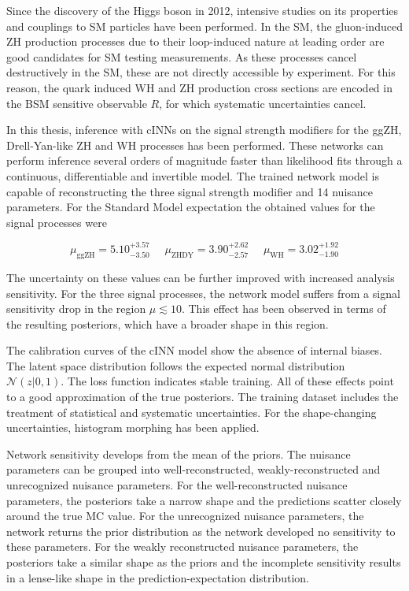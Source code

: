 \label{sec:conclusion}

Since the discovery of the Higgs boson in 2012, intensive studies on its properties and couplings to SM particles have been performed. In the SM, the gluon-induced ZH production processes due to their loop-induced nature at leading order are good candidates for SM testing measurements. As these processes cancel destructively in the SM, these are not directly accessible by experiment. For this reason, the quark induced WH and ZH production cross sections are encoded in the BSM sensitive observable $R$, for which systematic uncertainties cancel.

In this thesis, inference with cINNs on the signal strength modifiers for the ggZH, Drell-Yan-like ZH and WH processes has been performed. These networks can perform inference several orders of magnitude faster than likelihood fits through a continuous, differentiable and invertible model. The trained network model is capable of reconstructing the three signal strength modifier and 14 nuisance parameters.
For the Standard Model expectation the obtained values for the signal processes were

\begin{equation*}
		\mu_\text{ggZH} = 5.10^{+3.57}_{-3.50} \, \, \quad \mu_\text{ZHDY} = 3.90^{+2.62}_{-2.57} \, \, \quad \mu_\text{WH} = 3.02^{+1.92}_{-1.90}
\end{equation*}

The uncertainty on these values can be further improved with increased analysis sensitivity. For the three signal processes, the network model suffers from a signal sensitivity drop in the region $\mu\lesssim10$. This effect has been observed in terms of the resulting posteriors, which have a broader shape in this region.

The calibration curves of the cINN model show the absence of internal biases. The latent space distribution follows the expected normal distribution $\mathcal{N}(z | 0,1)$. The loss function indicates stable training. All of these effects point to a good approximation of the true posteriors. The training dataset includes the treatment of statistical and systematic uncertainties. For the shape-changing uncertainties, histogram morphing has been applied.

Network sensitivity develops from the mean of the priors. The nuisance parameters can be grouped into well-reconstructed, weakly-reconstructed and unrecognized nuisance parameters. For the well-reconstructed nuisance parameters, the posteriors take a narrow shape and the predictions scatter closely around the true MC value. For the unrecognized nuisance parameters, the network returns the prior distribution as the network developed no sensitivity to these parameters. For the weakly reconstructed nuisance parameters, the posteriors take a similar shape as the priors and the incomplete sensitivity results in a lense-like shape in the prediction-expectation distribution.

